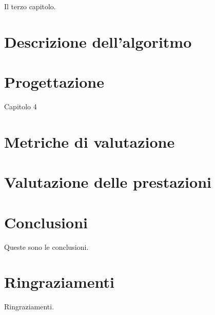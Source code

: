 \documentclass[12pt,a4paper,openright,twoside]{report}
\begin{document}
Il terzo capitolo.



\chapter{Descrizione dell'algoritmo}



\chapter{Progettazione}

Capitolo 4



\chapter{Metriche di valutazione}

\chapter{Valutazione delle prestazioni}

\chapter*{Conclusioni}


Queste sono le conclusioni.\\




\clearpage{\pagestyle{empty}\cleardoublepage}


{}



\rhead[\fancyplain{}{\bfseries \leftmark}]{\fancyplain{}{\bfseries\thepage}}
\clearpage{\pagestyle{empty}\cleardoublepage}



\chapter*{Ringraziamenti}
\thispagestyle{empty}
Ringraziamenti.

\nocite{*}
\end{document}
